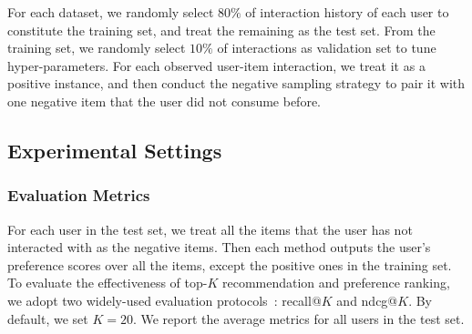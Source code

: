 \documentclass[sigconf]{acmart}
\theoremstyle{definition}
\begin{document}
For each dataset, we randomly select $80\%$ of interaction history of each user to constitute the training set, and treat the remaining as the test set.
From the training set, we randomly select $10\%$ of interactions as validation set to tune hyper-parameters.
For each observed user-item interaction, we treat it as a positive instance, and then conduct the negative sampling strategy to pair it with one negative item that the user did not consume before.

\subsection{Experimental Settings}

\begin{table}[t]
\caption{Statistics of the datasets.}
\vspace{-10px}
\label{tab:dataset}
\vspace{-15px}
\end{table}

\subsubsection{\textbf{Evaluation Metrics}}
For each user in the test set, we treat all the items that the user has not interacted with as the negative items.
Then each method outputs the user's preference scores over all the items, except the positive ones in the training set.
To evaluate the effectiveness of top-$K$ recommendation and preference ranking, we adopt two widely-used evaluation protocols~\cite{NCF,HOP-rec}: recall@$K$ and ndcg@$K$.
By default, we set $K=20$.
We report the average metrics for all users in the test set.
\end{document}
